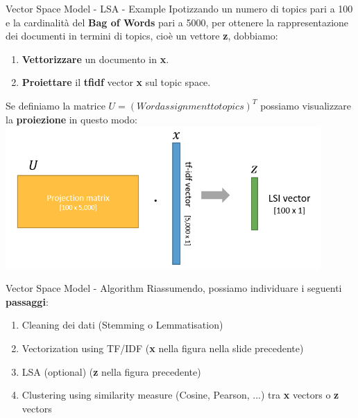 \documentclass[british]{beamer}
\begin{document}
\begin{frame}{Vector Space Model - LSA - Example}
	Ipotizzando un numero di topics pari a 100 e la cardinalit\`{a} del \textbf{Bag of Words} pari a 5000, per ottenere la rappresentazione dei documenti in termini di topics, cio\`{e} un vettore \textbf{z}, dobbiamo:
	\begin{enumerate}
		\item \textbf{Vettorizzare} un documento in \textbf{x}.
		\item \textbf{Proiettare} il \textbf{tfidf} vector \textbf{x} sul topic space.
	\end{enumerate}
	Se definiamo la matrice \(U = (Word assignment to topics)^T\) possiamo visualizzare la \textbf{proiezione} in questo modo:
	\includegraphics[width=0.9\textwidth, height=0.5\textheight]{./Imgs/LSI}

\end{frame}

\begin{frame}{Vector Space Model - Algorithm}
	Riassumendo, possiamo individuare i seguenti \textbf{passaggi}:
	\begin{enumerate}
		\item Cleaning dei dati (Stemming o Lemmatisation)
		\item Vectorization using TF/IDF (\textbf{x} nella figura nella slide precedente)
		\item LSA (optional) (\textbf{z} nella figura precedente)
		\item Clustering using similarity measure (Cosine, Pearson, ...) tra \textbf{x} vectors o \textbf{z} vectors
	\end{enumerate}
\end{frame}
\end{document}
